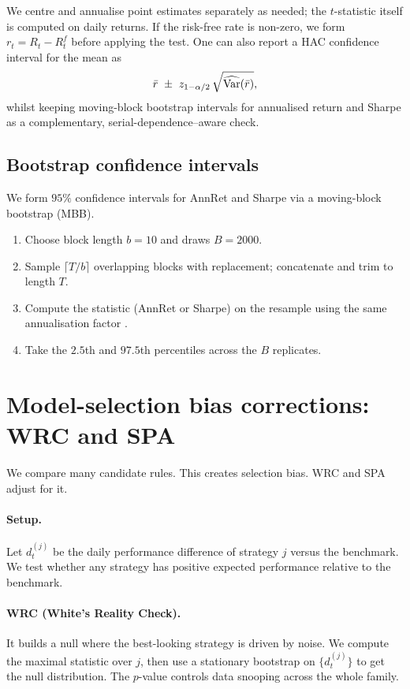 We centre and annualise point estimates separately as needed; the $t$-statistic itself is computed on daily returns. If the risk-free rate is non-zero, we form $r_t=R_t-R^{f}_t$ before applying the test. One can also report a HAC confidence interval for the mean as
\[
\bar r \ \pm\ z_{1-\alpha/2}\,\sqrt{\widehat{\Var}(\bar r)},
\]
whilst keeping moving-block bootstrap intervals for annualised return and Sharpe as a complementary, serial-dependence–aware check.

\subsection{Bootstrap confidence intervals}
We form $95\%$ confidence intervals for AnnRet and Sharpe via a moving-block bootstrap (MBB).
\begin{enumerate}[leftmargin=*,itemsep=2pt]
\item Choose block length $b=10$ and draws $B=2000$.
\item Sample $\lceil T/b\rceil$ overlapping blocks with replacement; concatenate and trim to length $T$.
\item Compute the statistic (AnnRet or Sharpe) on the resample using the same annualisation factor \annfac.
\item Take the $2.5$th and $97.5$th percentiles across the $B$ replicates.
\end{enumerate}

\section{Model-selection bias corrections: WRC and SPA}\label{app:wrc-spa-theory}

We compare many candidate rules. This creates selection bias. WRC and SPA adjust for it.

\paragraph{Setup.}
Let $d_t^{(j)}$ be the daily performance difference of strategy $j$ versus the benchmark.
We test whether any strategy has positive expected performance relative to the benchmark.

\paragraph{WRC (White’s Reality Check).}
It builds a null where the best-looking strategy is driven by noise.
We compute the maximal statistic over $j$, then use a stationary bootstrap on $\{d_t^{(j)}\}$ to get the null distribution.
The $p$-value controls data snooping across the whole family.

